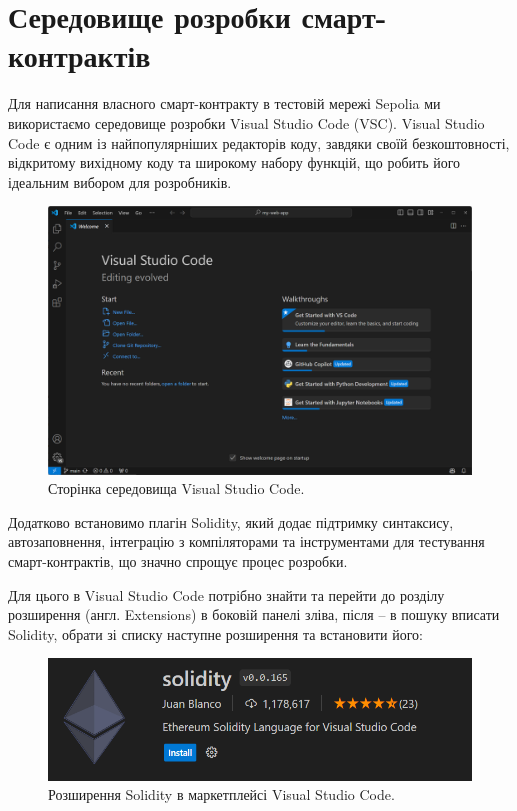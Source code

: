 \section{Середовище розробки смарт-контрактів}

Для написання власного смарт-контракту в тестовій мережі Sepolia ми використаємо середовище розробки Visual Studio Code (VSC). Visual Studio Code є одним із найпопулярніших редакторів коду, завдяки своїй безкоштовності, відкритому вихідному коду та широкому набору функцій, що робить його ідеальним вибором для розробників. 

    \begin{figure}[ht]
        \centering
        \includegraphics[scale=0.6]{IMAGES/vsc-page.png}
        \caption{Сторінка середовища Visual Studio Code.}
        \label{fig_sudak}
    \end{figure}

Додатково встановимо плагін Solidity, який додає підтримку синтаксису, автозаповнення, інтеграцію з компіляторами та інструментами для тестування смарт-контрактів, що значно спрощує процес розробки. 

Для цього в Visual Studio Code потрібно знайти та перейти до розділу розширення (англ. Extensions) в боковій панелі зліва, після -- в пошуку вписати Solidity, обрати зі списку наступне розширення та встановити його:

    \begin{figure}[ht]
        \centering
        \includegraphics[scale=0.6]{IMAGES/solidity-extension-vsc.png}
        \caption{Розширення Solidity в маркетплейсі Visual Studio Code.}
        \label{fig_vsc}
    \end{figure}

